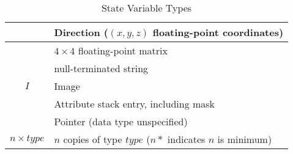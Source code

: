\begin{table}
\begin{center}
\begin{tabular}{|c|p{3in}|}
\deprow{$D$             & Direction ($(x,y,z)$ floating-point coordinates)          \\ \hline}
\deprow{$M^{4}$         & $4 \times 4$ floating-point matrix                        \\ \hline}
$S$             & null-terminated string                                    \\ \hline
$I$             & Image                                                     \\ \hline
\deprow{$A$             & Attribute stack entry, including mask                     \\ \hline}
$Y$             & Pointer (data type unspecified)                           \\ \hline
$n \times type$ & $n$ copies of type $type$ ($n*$ indicates $n$ is minimum) \\ \hline
\end{tabular}
\end{center}
\caption{State Variable Types}
\label{tab:acats}
\end{table}



\vfill\eject

\addtolength{\footskip}{1.0in}

\small

\def\fn1{$\dagger$}

\def\mtexcoord{8}               %
\def\mtexunit{2}                %
\def\mteximage{80}              %
\def\mimageunit{8}              %
\def\mvtxattr{16}               %
\def\mdrawbuf{8}                %
\def\mprogstage{6}              %
\def\mblockstage{14}            %
\def\mblockcombined{70}         %


